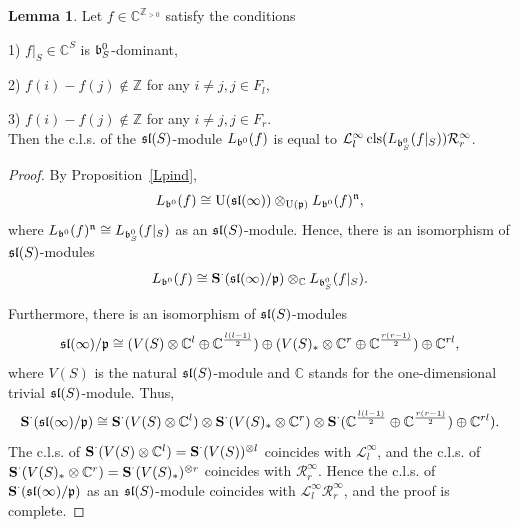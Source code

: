 \documentclass[10pt]{amsart}\oddsidemargin -1mm \evensidemargin -1mm \topmargin -15mm\headheight5mm \headsep 3.5mm \textheight 245mm\textwidth 170mm %
\theoremstyle{definition}\newtheorem{theorem}{Theorem}[section]\newtheorem{lemma}[theorem]{Lemma}\newtheorem{remark}[theorem]{Remark}\newtheorem{proposition}[theorem]{Proposition}\newtheorem{corollary}[theorem]{Corollary}\newtheorem{definition}[theorem]{Definition}\newtheorem{Ex}[theorem]{Example}
\begin{document}
\begin{lemma}\label{Lclspar}Let $f\in \mathbb C^{\mathbb Z_{>0}}$ satisfy the conditions

1) $f|_S\in \mathbb C^S$ is $\frak b^0_S$-dominant,

2) $f(i)-f(j)\notin\mathbb Z$ for any $i\ne j, j\in F_l$,

3) $f(i)-f(j)\notin\mathbb Z$ for any $i\ne j, j\in F_r$.\\
Then the c.l.s. of the $\frak{sl}(S)$-module $L_{\frak b^0}(f)$ is equal to
$\mathcal L^\infty_l\operatorname{\mathrm{cls}}(L_{\frak b^0_S}(f|_S))\mathcal R^\infty_r$.\end{lemma}
\begin{proof}%
By Proposition~\ref{Lpind},
$$L_{\frak b^0}(f)\cong \operatorname{\mathrm{U}}(\frak{sl}(\infty))\otimes_{\operatorname{\mathrm{U}}(\frak p)}L_{\frak b^0}(f)^{\frak n},$$where $L_{\frak b^0}(f)^{\frak n}\cong L_{\frak b^0_S}(f|_S)$ as an $\frak{sl}(S)$-module. Hence, there is an isomorphism of $\frak{sl}(S)$-modules
\begin{equation}L_{\frak b^0}(f)\cong \operatorname{\mathbf{S}}^\cdot(\frak{sl}(\infty)/\frak p) \otimes_{\mathbb C} L_{\frak b^0_S}(f|_S).\label{Etpind}\end{equation}

Furthermore, there is an isomorphism of $\frak{sl}(S)$-modules \begin{equation}\frak{sl}(\infty)/\frak p\cong (V(S)\otimes\mathbb C^l\oplus\mathbb C^{\frac{l(l-1)}2})\oplus(V(S)_*\otimes\mathbb C^r\oplus\mathbb C^{\frac{r(r-1)}2})\oplus\mathbb C^{rl},\label{Eraad}\end{equation}where $V(S)$ is the natural $\frak{sl}(S)$-module and $\mathbb C$ stands for the one-dimensional trivial $\frak{sl}(S)$-module. Thus,\begin{equation}\operatorname{\mathbf{S}}^\cdot(\frak{sl}(\infty)/\frak p)\cong
\operatorname{\mathbf{S}}^\cdot(V(S)\otimes\mathbb C^l)\otimes\operatorname{\mathbf{S}}^\cdot(V(S)_*\otimes\mathbb C^r)\otimes\operatorname{\mathbf{S}}^\cdot(\mathbb C^{\frac{l(l-1)}2}\oplus\mathbb C^{\frac{r(r-1)}2})\oplus\mathbb C^{rl}).\end{equation} The c.l.s. of
$\operatorname{\mathbf{S}}^\cdot(V(S)\otimes\mathbb C^l)=\operatorname{\mathbf{S}}^\cdot(V(S))^{\otimes l}$ coincides with $\mathcal L^\infty_l$,  and the c.l.s. of
$\operatorname{\mathbf{S}}^\cdot(V(S)_*\otimes\mathbb C^r)=\operatorname{\mathbf{S}}^\cdot(V(S)_*)^{\otimes r}$ coincides with $\mathcal R^\infty_r$. Hence the c.l.s. of $\operatorname{\mathbf{S}}^\cdot(\frak{sl}(\infty)/\frak p)$ as an $\frak{sl}(S)$-module coincides with $\mathcal
L_l^\infty\mathcal R^\infty_r$, and the proof is complete.\end{proof}
\end{document}

